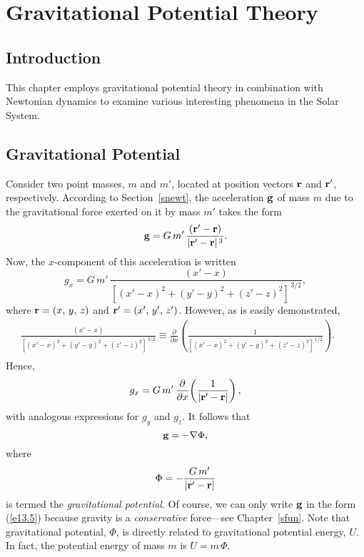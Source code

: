 \chapter{Gravitational Potential Theory}\label{spotn}
\section{Introduction}
This chapter employs gravitational potential theory in combination
with Newtonian dynamics
to examine various interesting phenomena in the Solar System.

\section{Gravitational Potential}
Consider two point masses, $m$ and $m'$, located at position vectors
${\bf r}$ and ${\bf r}'$, respectively. According to Section~\ref{snewt},
the acceleration ${\bf g}$ of mass $m$ due to the gravitational force exerted on it by mass $m'$ takes the form
\begin{equation}
{\bf g} = G\,m'\,\frac{({\bf r}'-{\bf r})}{|{\bf r}'-{\bf r}|^{\,3}}.
\end{equation} 
Now, the $x$-component of this acceleration is written
\begin{equation}
g_x = G\,m'\,\frac{(x'-x)}{[(x'-x)^2+(y'-y)^2+(z'-z)^2]^{\,3/2}},
\end{equation}
where ${\bf r}=(x,\, y,\, z)$ and ${\bf r}' = (x',\,y',\,z')$.
However, as is
easily demonstrated,
\begin{eqnarray}
\frac{(x'-x)}{[(x'-x)^2+(y'-y)^2+(z'-z)^2]^{\,3/2}}\equiv
 \frac{\partial}{\partial x}\!\left(\frac{1}{[(x'-x)^2+(y'-y)^2+(z'-z)^2]^{\,1/2}}\right).\nonumber\\[0.5ex]&&
\end{eqnarray}
Hence,
\begin{equation}
g_x = G\,m'\,\frac{\partial}{\partial x}\!\left(\frac{1}{|{\bf r}'-{\bf r}|}\right),
\end{equation}
with analogous expressions for $g_y$ and $g_z$. It follows that \begin{equation}\label{e13.5}
{\bf g} = -\nabla\Phi,
\end{equation}
where
\begin{equation}\label{e13.6}
\Phi = - \frac{G\,m'}{|{\bf r}'-{\bf r}|}
\end{equation}
is termed the {\em gravitational potential}. Of course,
we can only write ${\bf g}$ in the form (\ref{e13.5})  because gravity
is a {\em conservative}\/ force---see Chapter~\ref{sfun}.
Note that gravitational potential, $\Phi$, is
directly related to  gravitational potential energy, $U$. In fact, the
potential energy of mass $m$ is
$U=m\,\Phi$. 

